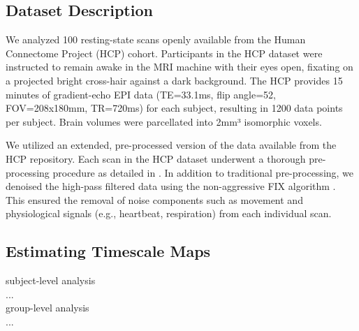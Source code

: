 \documentclass[main.tex]{subfiles}
\begin{document}
\subsection{Dataset Description}

We analyzed 100 resting-state scans openly available from the Human Connectome Project (HCP) cohort. Participants in the HCP dataset were instructed to remain awake in the MRI machine with their eyes open, fixating on a projected bright cross-hair against a dark background.  The HCP provides 15 minutes of gradient-echo EPI data (TE=33.1ms, flip angle=52, FOV=208x180mm, TR=720ms) for each subject, resulting in 1200 data points per subject. Brain volumes were parcellated into 2mm³ isomorphic voxels.

We utilized an extended, pre-processed version of the data available from the HCP repository.  Each scan in the HCP dataset underwent a thorough pre-processing procedure as detailed in \cite{glasser_minimal_2013}.   In addition to traditional pre-processing, we denoised the high-pass filtered data using the non-aggressive FIX algorithm \cite{salimi-khorshidi_automatic_2014}. This ensured the removal of noise components such as movement and physiological signals (e.g., heartbeat, respiration) from each individual scan.

\subsection*{Estimating Timescale Maps}
subject-level analysis\\
...\\
group-level analysis\\
...\\
\end{document}
